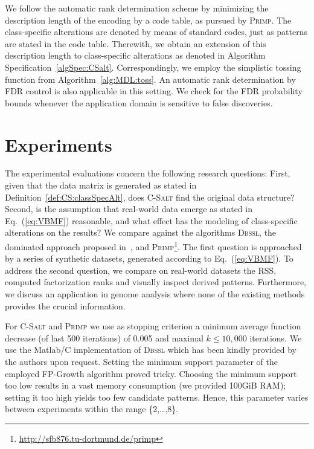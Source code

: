 We follow the automatic rank determination scheme by minimizing the description length of the encoding by a code table, as pursued by \textsc{Primp}. The class-specific alterations are denoted by means of standard codes, just as patterns are stated in the code table. Therewith, we obtain an extension of this description length to class-specific alterations as denoted in Algorithm Specification~\ref{algSpec:CSalt}. Correspondingly, we employ the simplistic tossing function from Algorithm~\ref{alg:MDL:toss}. An automatic rank determination by FDR control is also applicable in this setting. We check for the FDR probability bounds whenever the application domain is sensitive to false discoveries.  
\section{Experiments}
The experimental evaluations concern the following research questions: First, given that the data matrix is generated as stated in Definition~\ref{def:CS:classSpecAlt}, does \textsc{C-Salt} find the original data structure?
Second, is the assumption that real-world data emerge as stated in Eq.~(\ref{eq:VBMF}) reasonable, and what effect has the modeling of class-specific alterations on the results?
We compare against the algorithms \textsc{Dbssl}, the dominated approach proposed in~\cite{miettienen2012finding}, and \textsc{Primp}\footnote{\url{http://sfb876.tu-dortmund.de/primp}}.
The first question is approached by a series of synthetic datasets, generated according to Eq.~(\ref{eq:VBMF}). To address the second question, we compare on real-world datasets the RSS, computed factorization ranks and visually inspect derived patterns.
Furthermore, we discuss an application in genome analysis where none of the existing methods provides the crucial information.

For \textsc{C-Salt} and \textsc{Primp} we use as stopping criterion a minimum average function decrease (of last 500 iterations) of 0.005 and maximal $k\leq10,000$ iterations. We use the Matlab/C implementation of \textsc{Dbssl} which has been kindly provided by the authors upon request. Setting the minimum support parameter of the employed FP-Growth algorithm proved tricky. Choosing the minimum support too low results in a vast memory consumption (we provided 100GiB RAM); setting it too high yields too few candidate patterns. Hence, this parameter varies between experiments within the range \{2,\ldots,8\}.

